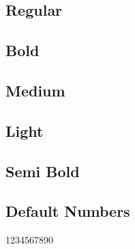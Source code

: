\documentclass{article}
\begin{document}
\subsection*{Regular}
\lipsum[1]


\subsection*{Bold}

\textbf{\lipsum[2]}

\subsection*{Medium}
{\selectfont\lipsum[5]}

\subsection*{Light}
{\selectfont\lipsum[5]}

\subsection*{Semi Bold}

{\selectfont\lipsum[6]}




\subsection*{Default Numbers}

1234567890
\end{document}
